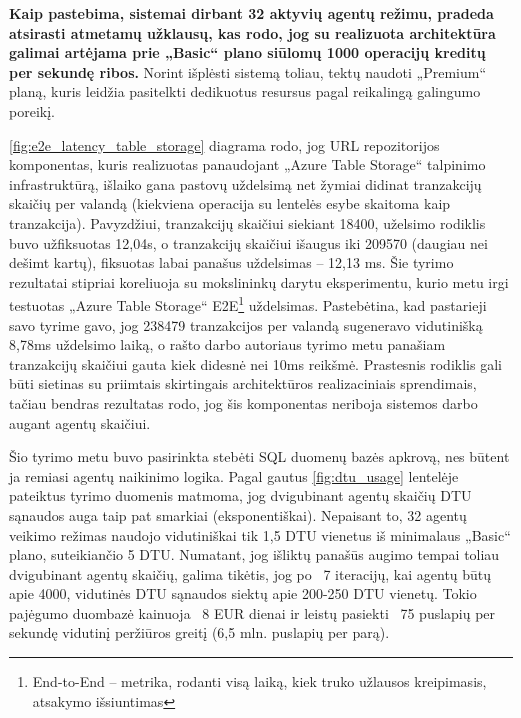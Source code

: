\textbf{Kaip pastebima, sistemai dirbant 32 aktyvių agentų režimu, pradeda atsirasti atmetamų užklausų, kas rodo, jog su realizuota architektūra galimai artėjama prie „Basic“ plano siūlomų 1000 operacijų kreditų per sekundę ribos.} Norint išplėsti sistemą toliau, tektų naudoti „Premium“ planą, kuris leidžia pasitelkti dedikuotus resursus pagal reikalingą galingumo poreikį.

\pagebreak


\ref{fig:e2e_latency_table_storage} diagrama rodo, jog URL repozitorijos komponentas, kuris realizuotas panaudojant „Azure Table Storage“ talpinimo infrastruktūrą, išlaiko gana pastovų uždelsimą net žymiai didinat tranzakcijų skaičių per valandą (kiekviena operacija su lentelės esybe skaitoma kaip tranzakcija). Pavyzdžiui, tranzakcijų skaičiui siekiant 18400, uželsimo rodiklis buvo užfiksuotas 12,04s, o tranzakcijų skaičiui išaugus iki 209570 (daugiau nei dešimt kartų), fiksuotas labai panašus uždelsimas -- 12,13 ms. Šie tyrimo rezultatai stipriai koreliuoja su \cite{MercedCloudBasedWebCrawler} mokslininkų darytu eksperimentu, kurio metu irgi testuotas „Azure Table Storage“ E2E\footnote{End-to-End -- metrika, rodanti visą laiką, kiek truko užlausos kreipimasis, atsakymo išsiuntimas} uždelsimas. Pastebėtina, kad pastarieji savo tyrime gavo, jog 238479 tranzakcijos per valandą sugeneravo vidutinišką 8,78ms uždelsimo laiką, o rašto darbo autoriaus tyrimo metu panašiam tranzakcijų skaičiui gauta kiek didesnė nei 10ms reikšmė. Prastesnis rodiklis gali būti sietinas su priimtais skirtingais architektūros realizaciniais sprendimais, tačiau bendras rezultatas rodo, jog šis komponentas neriboja sistemos darbo augant agentų skaičiui.


\pagebreak


Šio tyrimo metu buvo pasirinkta stebėti SQL duomenų bazės apkrovą, nes būtent ja remiasi agentų naikinimo logika. Pagal gautus \ref{fig:dtu_usage} lentelėje pateiktus tyrimo duomenis matmoma, jog dvigubinant agentų skaičių DTU sąnaudos auga taip pat smarkiai (eksponentiškai). Nepaisant to, 32 agentų veikimo režimas naudojo vidutiniškai tik 1,5 DTU vienetus iš minimalaus „Basic“ plano, suteikiančio 5 DTU. Numatant, jog išliktų panašūs augimo tempai toliau dvigubinant agentų skaičių, galima tikėtis, jog po ~7 iteracijų, kai agentų būtų apie 4000, vidutinės DTU sąnaudos siektų apie 200-250 DTU vienetų. Tokio pajėgumo duombazė kainuoja ~8 EUR dienai ir leistų pasiekti ~75 puslapių per sekundę vidutinį peržiūros greitį (6,5 mln. puslapių per parą).


